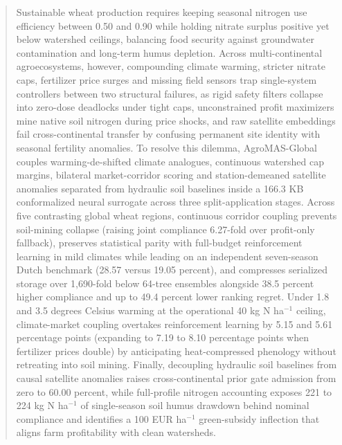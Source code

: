\documentclass[11pt,a4paper]{article}
\begin{document}
\begin{abstract}

Sustainable wheat production requires keeping seasonal nitrogen use efficiency between 0.50 and 0.90 while holding nitrate surplus positive yet below watershed ceilings, balancing food security against groundwater contamination and long-term humus depletion. Across multi-continental agroecosystems, however, compounding climate warming, stricter nitrate caps, fertilizer price surges and missing field sensors trap single-system controllers between two structural failures, as rigid safety filters collapse into zero-dose deadlocks under tight caps, unconstrained profit maximizers mine native soil nitrogen during price shocks, and raw satellite embeddings fail cross-continental transfer by confusing permanent site identity with seasonal fertility anomalies. To resolve this dilemma, AgroMAS-Global couples warming-de-shifted climate analogues, continuous watershed cap margins, bilateral market-corridor scoring and station-demeaned satellite anomalies separated from hydraulic soil baselines inside a 166.3 KB conformalized neural surrogate across three split-application stages. Across five contrasting global wheat regions, continuous corridor coupling prevents soil-mining collapse (raising joint compliance 6.27-fold over profit-only fallback), preserves statistical parity with full-budget reinforcement learning in mild climates while leading on an independent seven-season Dutch benchmark (28.57 versus 19.05 percent), and compresses serialized storage over 1,690-fold below 64-tree ensembles alongside 38.5 percent higher compliance and up to 49.4 percent lower ranking regret. Under 1.8 and 3.5 degrees Celsius warming at the operational 40 kg N ha$^{-1}$ ceiling, climate-market coupling overtakes reinforcement learning by 5.15 and 5.61 percentage points (expanding to 7.19 to 8.10 percentage points when fertilizer prices double) by anticipating heat-compressed phenology without retreating into soil mining. Finally, decoupling hydraulic soil baselines from causal satellite anomalies raises cross-continental prior gate admission from zero to 60.00 percent, while full-profile nitrogen accounting exposes 221 to 224 kg N ha$^{-1}$ of single-season soil humus drawdown behind nominal compliance and identifies a 100 EUR ha$^{-1}$ green-subsidy inflection that aligns farm profitability with clean watersheds.

\end{abstract}

\FloatBarrier
\end{document}
